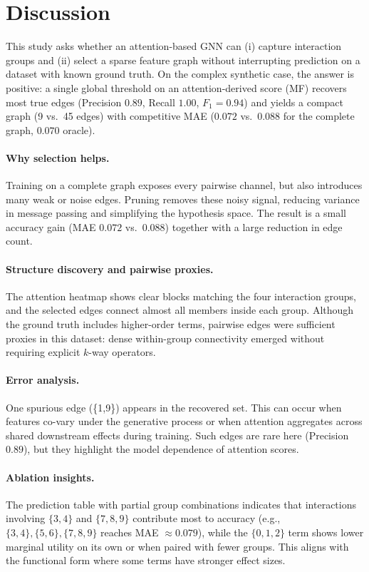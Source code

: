 \documentclass[10pt,a4paper]{article}
\begin{document}
\section{Discussion}
This study asks whether an attention-based GNN can (i) capture interaction groups and (ii) select a sparse feature graph without interrupting prediction on a dataset with known ground truth. On the complex synthetic case, the answer is positive: a single global threshold on an attention-derived score (MF) recovers most true edges (Precision $0.89$, Recall $1.00$, $F_1=0.94$) and yields a compact graph (9 vs.\ 45 edges) with competitive MAE ($0.072$ vs.\ $0.088$ for the complete graph, $0.070$ oracle).

\paragraph{Why selection helps.}
Training on a complete graph exposes every pairwise channel, but also introduces many weak or noise edges. Pruning removes these noisy signal, reducing variance in message passing and simplifying the hypothesis space. The result is a small accuracy gain (MAE $0.072$ vs.\ $0.088$) together with a large reduction in edge count.

\paragraph{Structure discovery and pairwise proxies.}
The attention heatmap shows clear blocks matching the four interaction groups, and the selected edges connect almost all members inside each group. Although the ground truth includes higher-order terms, pairwise edges were sufficient proxies in this dataset: dense within-group connectivity emerged without requiring explicit $k$-way operators.

\paragraph{Error analysis.}
One spurious edge (\{1,9\}) appears in the recovered set. This can occur when features co-vary under the generative process or when attention aggregates across shared downstream effects during training. Such edges are rare here (Precision $0.89$), but they highlight the model dependence of attention scores.

\paragraph{Ablation insights.}
The prediction table with partial group combinations indicates that interactions involving $\{3,4\}$ and $\{7,8,9\}$ contribute most to accuracy (e.g., $\{3,4\},\{5,6\},\{7,8,9\}$ reaches MAE $\approx 0.079$), while the $\{0,1,2\}$ term shows lower marginal utility on its own or when paired with fewer groups. This aligns with the functional form where some terms have stronger effect sizes.
\end{document}
